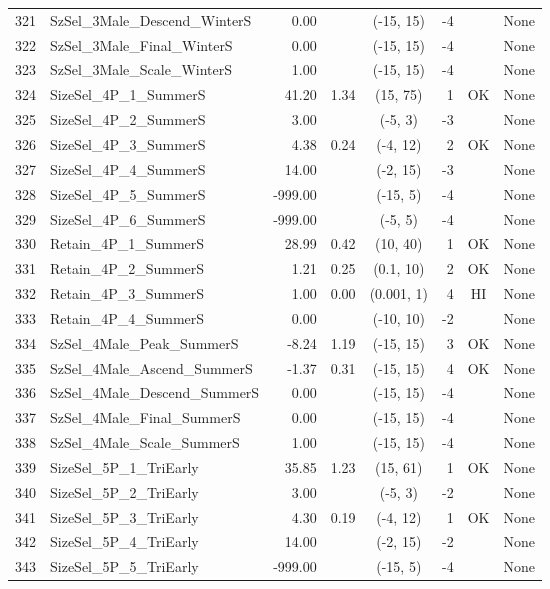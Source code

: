 \documentclass[12pt,]{article}
\begin{document}
\begin{landscape}
\begin{longtable}{rlrrcrcl}
  321 & SzSel\_3Male\_Descend\_WinterS & 0.00 &  & (-15, 15) & -4 &  & None \\ 
  322 & SzSel\_3Male\_Final\_WinterS & 0.00 &  & (-15, 15) & -4 &  & None \\ 
  323 & SzSel\_3Male\_Scale\_WinterS & 1.00 &  & (-15, 15) & -4 &  & None \\ 
  324 & SizeSel\_4P\_1\_SummerS & 41.20 & 1.34 & (15, 75) & 1 & OK & None \\ 
  325 & SizeSel\_4P\_2\_SummerS & 3.00 &  & (-5, 3) & -3 &  & None \\ 
  326 & SizeSel\_4P\_3\_SummerS & 4.38 & 0.24 & (-4, 12) & 2 & OK & None \\ 
  327 & SizeSel\_4P\_4\_SummerS & 14.00 &  & (-2, 15) & -3 &  & None \\ 
  328 & SizeSel\_4P\_5\_SummerS & -999.00 &  & (-15, 5) & -4 &  & None \\ 
  329 & SizeSel\_4P\_6\_SummerS & -999.00 &  & (-5, 5) & -4 &  & None \\ 
  330 & Retain\_4P\_1\_SummerS & 28.99 & 0.42 & (10, 40) & 1 & OK & None \\ 
  331 & Retain\_4P\_2\_SummerS & 1.21 & 0.25 & (0.1, 10) & 2 & OK & None \\ 
  332 & Retain\_4P\_3\_SummerS & 1.00 & 0.00 & (0.001, 1) & 4 & HI & None \\ 
  333 & Retain\_4P\_4\_SummerS & 0.00 &  & (-10, 10) & -2 &  & None \\ 
  334 & SzSel\_4Male\_Peak\_SummerS & -8.24 & 1.19 & (-15, 15) & 3 & OK & None \\ 
  335 & SzSel\_4Male\_Ascend\_SummerS & -1.37 & 0.31 & (-15, 15) & 4 & OK & None \\ 
  336 & SzSel\_4Male\_Descend\_SummerS & 0.00 &  & (-15, 15) & -4 &  & None \\ 
  337 & SzSel\_4Male\_Final\_SummerS & 0.00 &  & (-15, 15) & -4 &  & None \\ 
  338 & SzSel\_4Male\_Scale\_SummerS & 1.00 &  & (-15, 15) & -4 &  & None \\ 
  339 & SizeSel\_5P\_1\_TriEarly & 35.85 & 1.23 & (15, 61) & 1 & OK & None \\ 
  340 & SizeSel\_5P\_2\_TriEarly & 3.00 &  & (-5, 3) & -2 &  & None \\ 
  341 & SizeSel\_5P\_3\_TriEarly & 4.30 & 0.19 & (-4, 12) & 1 & OK & None \\ 
  342 & SizeSel\_5P\_4\_TriEarly & 14.00 &  & (-2, 15) & -2 &  & None \\ 
  343 & SizeSel\_5P\_5\_TriEarly & -999.00 &  & (-15, 5) & -4 &  & None \\ 

\end{longtable}
\end{landscape}
\end{document}
